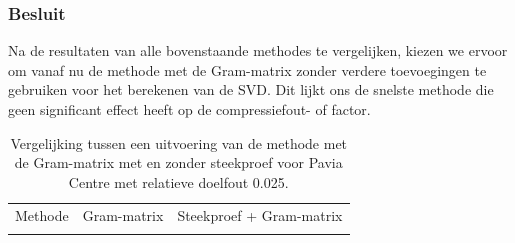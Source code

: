\subsubsection{Besluit}

Na de resultaten van alle bovenstaande methodes te vergelijken, kiezen we ervoor om vanaf nu de methode met de Gram-matrix zonder verdere toevoegingen te gebruiken voor het berekenen van de SVD. Dit lijkt ons de snelste methode die geen significant effect heeft op de compressiefout- of factor.

\begin{table}[H]
\centering
\begin{tabular}{|l|l|l|}
\hline
Methode & Gram-matrix & Steekproef + Gram-matrix\\ \hhline{|=|=|=|}

\end{tabular}
\caption{Vergelijking tussen een uitvoering van de methode met de Gram-matrix met en zonder steekproef voor Pavia Centre met relatieve doelfout 0.025.}
\label{table:randomized-svd-pavia-test}
\end{table}